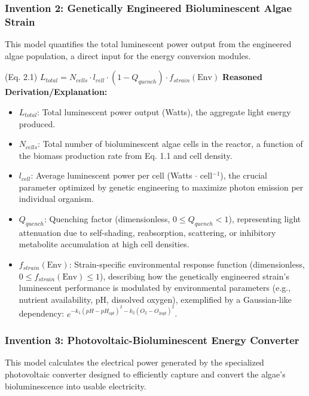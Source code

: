 \documentclass{article}
\newenvironment{reasonedderivation}{
    \textbf{Reasoned Derivation/Explanation:}
    \begin{itemize}
}{
    \end{itemize}
}
\begin{document}
\subsubsection*{Invention 2: Genetically Engineered Bioluminescent Algae Strain}
This model quantifies the total luminescent power output from the engineered algae population, a direct input for the energy conversion modules.

(Eq. 2.1) $L_{total} = N_{cells} \cdot l_{cell} \cdot (1 - Q_{quench}) \cdot f_{strain}(\text{Env})$
\begin{reasonedderivation}
    \item $L_{total}$: Total luminescent power output (Watts), the aggregate light energy produced.
    \item $N_{cells}$: Total number of bioluminescent algae cells in the reactor, a function of the biomass production rate from Eq. 1.1 and cell density.
    \item $l_{cell}$: Average luminescent power per cell (Watts $\cdot$ cell$^{-1}$), the crucial parameter optimized by genetic engineering to maximize photon emission per individual organism.
    \item $Q_{quench}$: Quenching factor (dimensionless, $0 \le Q_{quench} < 1$), representing light attenuation due to self-shading, reabsorption, scattering, or inhibitory metabolite accumulation at high cell densities.
    \item $f_{strain}(\text{Env})$: Strain-specific environmental response function (dimensionless, $0 \le f_{strain}(\text{Env}) \le 1$), describing how the genetically engineered strain's luminescent performance is modulated by environmental parameters (e.g., nutrient availability, pH, dissolved oxygen), exemplified by a Gaussian-like dependency: $e^{-k_1(pH-pH_{opt})^2 - k_2(O_2-O_{2opt})^2}$.
\end{reasonedderivation}

\subsubsection*{Invention 3: Photovoltaic-Bioluminescent Energy Converter}
This model calculates the electrical power generated by the specialized photovoltaic converter designed to efficiently capture and convert the algae's bioluminescence into usable electricity.
\end{document}

